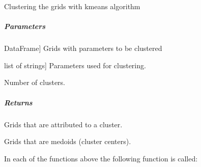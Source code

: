 \documentclass[letterpaper,10pt,english]{sphinxmanual}
\begin{document}
\begin{fulllineitems}
\label{\detokenize{classification/classification_steps/clustering:classification.clustering.clustering_algorithms.kmeans_clustering}}
\pysigstartsignatures
{}
\pysigstopsignatures
\sphinxAtStartPar
Clustering the grids with kmeans algorithm


\subparagraph{Parameters}
\label{\detokenize{classification/classification_steps/clustering:id3}}\begin{description}
\sphinxlineitem{df\_parameters\_of\_grids}{[}DataFrame{]}
\sphinxAtStartPar
Grids with parameters to be clustered

\sphinxlineitem{list\_of\_clustering\_parameters}{[}list of strings{]}
\sphinxAtStartPar
Parameters used for clustering.

\sphinxAtStartPar
Number of clusters.

\end{description}


\subparagraph{Returns}
\label{\detokenize{classification/classification_steps/clustering:id4}}\begin{description}
\sphinxAtStartPar
Grids that are attributed to a cluster.

\sphinxAtStartPar
Grids that are medoids (cluster centers).

\end{description}

\end{fulllineitems}


\sphinxAtStartPar
In each of the functions above the following function is called:
\end{document}
